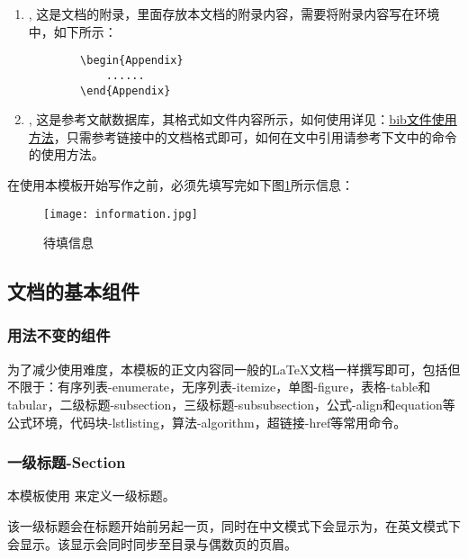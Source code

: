 \documentclass{nitthesis}
\begin{document}
\begin{enumerate}
    \item {}, 这是文档的附录，里面存放本文档的附录内容，需要将附录内容写在环境中，如下所示：
    \begin{lstlisting}
        \begin{Appendix}
            ......
        \end{Appendix}
    \end{lstlisting}

    \item {}, 这是参考文献数据库，其格式如文件内容所示，如何使用详见：\href{https://blog.csdn.net/tmylzq187/article/details/51355261}{bib文件使用方法}，只需参考链接中的文档格式即可，如何在文中引用请参考下文中的命令的使用方法。
\end{enumerate}

在使用本模板开始写作之前，必须先填写完如下图\ref{fig.Information}所示信息：

\begin{figure}[H]
    \centering
    \texttt{[image: information.jpg]}
    \caption{待填信息}
    \label{fig.Information}
\end{figure}

\subsection{文档的基本组件}

\subsubsection{用法不变的组件}

为了减少使用难度，本模板的正文内容同一般的\LaTeX 文档一样撰写即可，包括但不限于：有序列表-enumerate，无序列表-itemize，单图-figure，表格-table和tabular，二级标题-subsection，三级标题-subsubsection，公式-align和equation等公式环境，代码块-lstlisting，算法-algorithm，超链接-href等常用命令。

\subsubsection{一级标题-Section}

本模板使用  来定义一级标题。

该一级标题会在标题开始前另起一页，同时在中文模式下会显示为，在英文模式下会显示。该显示会同时同步至目录与偶数页的页眉。
\end{document}
